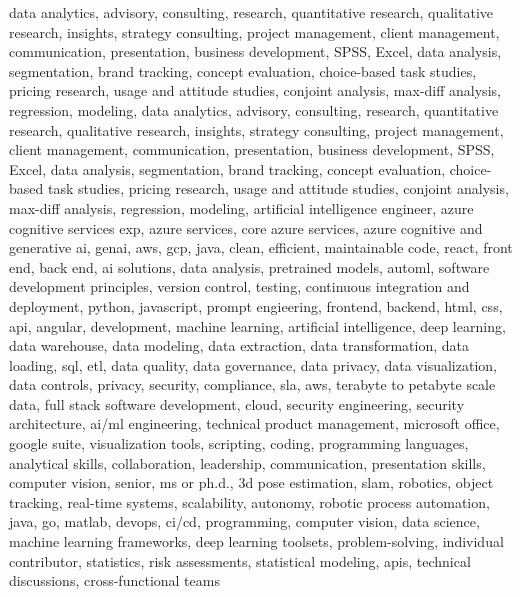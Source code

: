 \documentclass{resume} %
\begin{document}
 


\newcommand\myfontsize{\fontsize{0.1pt}{0.1pt}\selectfont} \myfontsize \color{white}
data analytics, advisory, consulting, research, quantitative research, qualitative research, insights, strategy consulting, project management, client management, communication, presentation, business development, SPSS, Excel, data analysis, segmentation, brand tracking, concept evaluation, choice{-}based task studies, pricing research, usage and attitude studies, conjoint analysis, max{-}diff analysis, regression, modeling, data analytics, advisory, consulting, research, quantitative research, qualitative research, insights, strategy consulting, project management, client management, communication, presentation, business development, SPSS, Excel, data analysis, segmentation, brand tracking, concept evaluation, choice{-}based task studies, pricing research, usage and attitude studies, conjoint analysis, max{-}diff analysis, regression, modeling, {artificial intelligence engineer, azure cognitive services exp, azure services, core azure services, azure cognitive and generative ai, genai, aws,  gcp, java, clean, efficient, maintainable code, react, front end, back end, ai solutions, data analysis, pretrained models, automl, software development principles, version control, testing, continuous integration and deployment, python, javascript, prompt engieering, frontend, backend, html, css, api, angular, development, machine learning, artificial intelligence, deep learning, data warehouse, data modeling, data extraction, data transformation, data loading, sql, etl, data quality, data governance, data privacy, data visualization, data controls, privacy, security, compliance, sla, aws, terabyte to petabyte scale data, full stack software development, cloud, security engineering, security architecture, ai/ml engineering, technical product management, microsoft office, google suite, visualization tools, scripting, coding, programming languages, analytical skills, collaboration, leadership, communication, presentation skills, computer vision, senior, ms or ph.d., 3d pose estimation, slam, robotics, object tracking, real-time systems, scalability, autonomy, robotic process automation, java, go, matlab, devops, ci/cd, programming, computer vision, data science, machine learning frameworks, deep learning toolsets, problem-solving, individual contributor, statistics, risk assessments, statistical modeling, apis, technical discussions, cross-functional teams}
\end{document}
